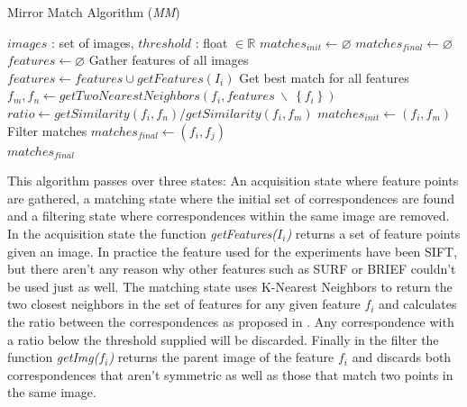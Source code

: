 \documentclass{article}
\begin{document}
\begin{algorithm}
\caption{Mirror Match Algorithm (\emph{MM})}
\label{alg-mm}
\begin{algorithmic}
\Require $images$ : set of images, $threshold$ : float $\in \mathbb{R}$
\State $matches_{init}\gets \varnothing$
\State $matches_{final}\gets \varnothing$
\State $features\gets \varnothing$
 \Comment Gather features of all images
	\State $features\gets features \cup getFeatures(I_i)$
\EndFor
{} \Comment Get best match for all features
	\State $f_m,f_n \gets getTwoNearestNeighbors(f_i, features ~ 
\backslash ~ \left\{f_i\right\})$
	\State $ratio \gets getSimilarity(f_i, f_n) / getSimilarity(f_i, 
f_m)$
		\State $matches_{init} \gets \left(f_i, f_m\right)$
	\EndIf
\EndFor
{} \Comment Filter 
matches
		\State $matches_{final} \gets (f_i, f_j)$
	\EndIf
\EndFor \\
\Return $matches_{final}$
\end{algorithmic}
\end{algorithm}

This algorithm passes over three states: An acquisition state where 
feature points are gathered, a matching state where the initial set of 
correspondences are found and a filtering state where correspondences 
within the same image are removed. In the acquisition state the function 
\emph{getFeatures($I_i$)} returns a set of feature points given an 
image.  In practice the feature used for the experiments have been 
SIFT\cite{lowe2004sift}, but there aren't any reason why other features 
such as SURF\cite{bay2006surf} or BRIEF\cite{calonder2010brief} couldn't 
be used just as well. The matching state uses K-Nearest Neighbors to 
return the two closest neighbors in the set of features for any given 
feature $f_i$ and calculates the ratio between the correspondences as 
proposed in \cite{lowe2004sift}.  Any correspondence with a ratio below 
the threshold supplied will be discarded. Finally in the filter the 
function \emph{getImg($f_i$)} returns the parent image of the feature 
$f_i$ and discards both correspondences that aren't symmetric as well as 
those that match two points in the same image.
\end{document}
